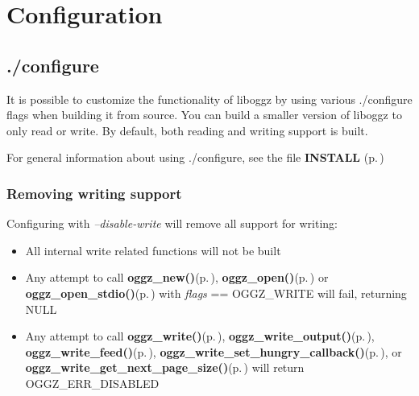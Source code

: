 \section{Configuration}
\label{group__configuration}
\subsection{./configure}\label{configure}
It is possible to customize the functionality of liboggz by using various ./configure flags when building it from source. You can build a smaller version of liboggz to only read or write. By default, both reading and writing support is built.

For general information about using ./configure, see the file {\bf INSTALL }{\rm (p.\,\pageref{group__install})}\subsubsection{Removing writing support}\label{no_encode}
Configuring with {\em --disable-write\/} will remove all support for writing:\begin{itemize}
\item All internal write related functions will not be built\item Any attempt to call {\bf oggz\_\-new()}{\rm (p.\,\pageref{oggz_8h_a4})}, {\bf oggz\_\-open()}{\rm (p.\,\pageref{oggz_8h_a5})} or {\bf oggz\_\-open\_\-stdio()}{\rm (p.\,\pageref{oggz_8h_a6})} with {\em flags\/} == OGGZ\_\-WRITE will fail, returning NULL\item Any attempt to call {\bf oggz\_\-write()}{\rm (p.\,\pageref{group__write__api_a4})}, {\bf oggz\_\-write\_\-output()}{\rm (p.\,\pageref{group__write__api_a3})}, {\bf oggz\_\-write\_\-feed()}{\rm (p.\,\pageref{group__write__api_a2})}, {\bf oggz\_\-write\_\-set\_\-hungry\_\-callback()}{\rm (p.\,\pageref{group__write__api_a1})}, or {\bf oggz\_\-write\_\-get\_\-next\_\-page\_\-size()}{\rm (p.\,\pageref{group__write__api_a5})} will return OGGZ\_\-ERR\_\-DISABLED\end{itemize}
